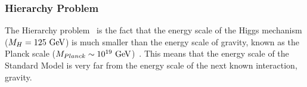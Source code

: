 
\subsubsection{Hierarchy Problem}

The Hierarchy problem~\cite{theo-hierarchy} is the fact that the energy scale of the Higgs mechanism ($M_{H}\nobreak=\nobreak125~\text{GeV}$)
is much smaller than the energy scale of gravity,
known as the Planck scale ($M_{Planck}\nobreak\sim\nobreak10^{19}~\text{GeV}$)~\cite{obj-bjets_PDG}.
This means that the energy scale of the Standard Model is very far
from the energy scale of the next known interaction, gravity.


